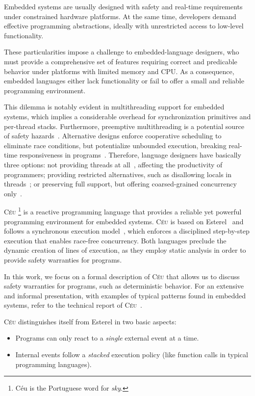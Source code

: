 \documentclass[preprint]{sigplanconf}
\newcommand{\CEU}{\textsc{C\'{e}u}\xspace}
\newcommand{\1}{\;}
\newcommand{\2}{\;\;}
\newcommand{\3}{\;\;\;}
\newcommand{\5}{\;\;\;\;\;}
\begin{document}
Embedded systems are usually designed with safety and real-time requirements 
under constrained hardware platforms.
At the same time, developers demand effective programming abstractions, ideally 
with unrestricted access to low-level functionality.

These particularities impose a challenge to embedded-language designers, who 
must provide a comprehensive set of features requiring correct and predicable 
behavior under platforms with limited memory and CPU.
As a consequence, embedded languages either lack functionality or fail to offer 
a small and reliable programming environment.

This dilemma is notably evident in multithreading support for embedded systems, 
which implies a considerable overhead for synchronization primitives and 
per-thread stacks.
Furthermore, preemptive multithreading is a potential source of safety 
hazards~\cite{sync_async.threadsproblems}.
Alternative designs enforce cooperative scheduling to eliminate race 
conditions, but potentialize unbounded execution, breaking real-time 
responsiveness in programs~\cite{wsn.comparison}.
Therefore, language designers have basically three options:
not providing threads at all~\cite{wsn.nesc}, affecting the productivity of 
programmers;
providing restricted alternatives, such as disallowing locals in 
threads~\cite{wsn.protothreads};
or preserving full support, but offering coarsed-grained concurrency 
only~\cite{wsn.mantisos}.

\CEU%
\footnote{C\'eu is the Portuguese word for \emph{sky}.}
is a reactive programming language that provides a reliable yet powerful 
programming environment for embedded systems.
\CEU is based on Esterel~\cite{esterel.ieee91} and follows a synchronous 
execution model~\cite{rp.twelve}, which enforces a disciplined step-by-step 
execution that enables race-free concurrency.
Both languages preclude the dynamic creation of lines of execution, as they 
employ static analysis in order to provide safety warranties for programs.

In this work, we focus on a formal description of \CEU that allows us to 
discuss safety warranties for programs, such as deterministic behavior.
For an extensive and informal presentation, with examples of typical patterns 
found in embedded systems, refer to the technical report of \CEU~\cite{ceu.tr}.

\CEU distinguishes itself from Esterel in two basic aspects:

\begin{itemize}
\item Programs can only react to a \emph{single} external event at a time.  
\item Internal events follow a \emph{stacked} execution policy (like function 
calls in typical programming languages).
\end{itemize}
\end{document}
